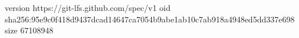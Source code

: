 version https://git-lfs.github.com/spec/v1
oid sha256:95e9c0f418d9437dcad14647ca7054b9abe1ab10c7ab918a4948ed5dd337e698
size 67108948
